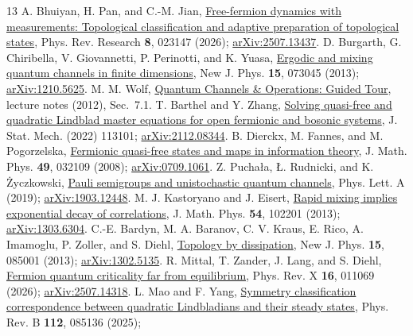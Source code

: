 \documentclass[aps,prb,onecolumn,nofootinbib,superscriptaddress,floatfix]{revtex4-2}
\begin{document}
\begin{thebibliography}{13}
 A. Bhuiyan, H. Pan, and C.-M. Jian,
\href{https://doi.org/10.1103/nk38-ygyq}{Free-fermion dynamics with measurements:
Topological classification and adaptive preparation of topological states},
Phys. Rev. Research \textbf{8}, 023147 (2026);
\href{https://arxiv.org/abs/2507.13437}{arXiv:2507.13437}.
 D. Burgarth, G. Chiribella, V. Giovannetti,
P. Perinotti, and K. Yuasa,
\href{https://doi.org/10.1088/1367-2630/15/7/073045}{Ergodic and mixing
quantum channels in finite dimensions}, New J. Phys. \textbf{15}, 073045 (2013);
\href{https://arxiv.org/abs/1210.5625}{arXiv:1210.5625}.
 M. M. Wolf,
\href{https://mediatum.ub.tum.de/doc/1701036/document.pdf}{Quantum Channels
\& Operations: Guided Tour}, lecture notes (2012), Sec.~7.1.
 T. Barthel and Y. Zhang,
\href{https://doi.org/10.1088/1742-5468/ac8e5c}{Solving quasi-free and quadratic
Lindblad master equations for open fermionic and bosonic systems},
J. Stat. Mech. (2022) 113101;
\href{https://arxiv.org/abs/2112.08344}{arXiv:2112.08344}.
 B. Dierckx, M. Fannes, and M. Pogorzelska,
\href{https://doi.org/10.1063/1.2841326}{Fermionic quasi-free states and maps
in information theory}, J. Math. Phys. \textbf{49}, 032109 (2008);
\href{https://arxiv.org/abs/0709.1061}{arXiv:0709.1061}.
 Z. Pucha\l{}a, \L{}. Rudnicki, and K. \.{Z}yczkowski,
\href{https://doi.org/10.1016/j.physleta.2019.04.057}{Pauli semigroups and
unistochastic quantum channels}, Phys. Lett. A (2019);
\href{https://arxiv.org/abs/1903.12448}{arXiv:1903.12448}.
 M. J. Kastoryano and J. Eisert,
\href{https://doi.org/10.1063/1.4822481}{Rapid mixing implies exponential
decay of correlations}, J. Math. Phys. \textbf{54}, 102201 (2013);
\href{https://arxiv.org/abs/1303.6304}{arXiv:1303.6304}.
 C.-E. Bardyn, M. A. Baranov, C. V. Kraus, E. Rico,
A. Imamoglu, P. Zoller, and S. Diehl,
\href{https://doi.org/10.1088/1367-2630/15/8/085001}{Topology by dissipation},
New J. Phys. \textbf{15}, 085001 (2013);
\href{https://arxiv.org/abs/1302.5135}{arXiv:1302.5135}.
 R. Mittal, T. Zander, J. Lang, and S. Diehl,
\href{https://doi.org/10.1103/nj2d-l6pz}{Fermion quantum criticality far
from equilibrium}, Phys. Rev. X \textbf{16}, 011069 (2026);
\href{https://arxiv.org/abs/2507.14318}{arXiv:2507.14318}.
 L. Mao and F. Yang,
\href{https://doi.org/10.1103/p8xr-4yzl}{Symmetry classification
correspondence between quadratic Lindbladians and their steady states},
Phys. Rev. B \textbf{112}, 085136 (2025);

\end{thebibliography}
\end{document}
